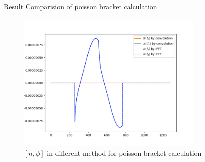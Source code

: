 \documentclass{beamer}
\begin{document}
\begin{frame}{Result Comparision of poisson bracket calculation}
	
	\begin{figure}[H]
		\centering
		\includegraphics[width=0.8\textwidth]{./images/poisson.png}
		\caption{$[n,\phi]$ in different method for poisson bracket calculation}
	\end{figure}
	
\end{frame}
\end{document}
